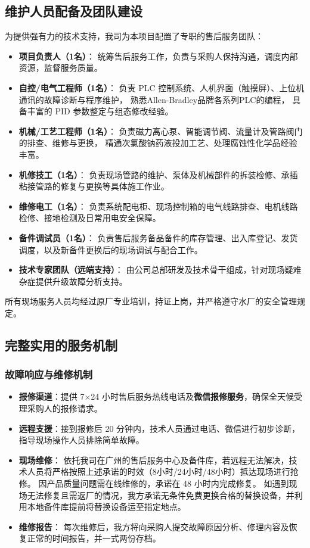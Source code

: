 \documentclass[UTF8,a4paper,12pt,titlepage]{ctexart}
\begin{document}
\subsection{维护人员配备及团队建设}
为提供强有力的技术支持，我司为本项目配置了专职的售后服务团队：
\begin{itemize}
    \item \textbf{项目负责人（1名）}：
        统筹售后服务工作，负责与采购人保持沟通，调度内部资源，监督服务质量。
    \item \textbf{自控/电气工程师（1名）}：
        负责 PLC 控制系统、人机界面（触摸屏）、上位机通讯的故障诊断与程序维护，
        熟悉Allen-Bradley品牌各系列PLC的编程，
        具备丰富的 PID 参数整定与组态修改经验。
    \item \textbf{机械/工艺工程师（1名）}：
        负责磁力离心泵、智能调节阀、流量计及管路阀门的排查、维修与更换，
        精通次氯酸钠药液投加工艺、处理腐蚀性化学品经验丰富。
    \item \textbf{机修技工（1名）}：
        负责现场管路的维护、泵体及机械部件的拆装检修、承插粘接管路的修复与更换等具体施工作业。
    \item \textbf{维修电工（1名）}：
        负责系统配电柜、现场控制箱的电气线路排查、电机线路检修、接地检测及日常用电安全保障。
    \item \textbf{备件调试员（1名）}：
        负责售后服务备品备件的库存管理、出入库登记、发货调度，以及新备件更换后的现场调试与配合工作。
    \item \textbf{技术专家团队（远端支持）}：
        由公司总部研发及技术骨干组成，针对现场疑难杂症提供升级故障分析支持。
\end{itemize}
所有现场服务人员均经过原厂专业培训，持证上岗，并严格遵守水厂的安全管理规定。

\subsection{完整实用的服务机制}
\subsubsection{故障响应与维修机制}
\begin{itemize}
    \item \textbf{报修渠道}：提供 7×24 小时售后服务热线电话及\textbf{微信报修服务}，确保全天候受理采购人的报修请求。
    \item \textbf{远程支援}：接到报修后 20 分钟内，技术人员通过电话、微信进行初步诊断，指导现场操作人员排除简单故障。
    \item \textbf{现场维修}：
        依托我司在广州的售后服务中心及备件库，若远程无法解决，技术人员将严格按照上述承诺的时效（8小时/24小时/48小时）抵达现场进行抢修。
        因产品质量问题需在线维修的，承诺在 48 小时内完成修复。
        如遇到现场无法修复且需返厂的情况，我方承诺无条件免费更换合格的替换设备，并利用本地备件库提前将替换设备运至指定地点。
    \item \textbf{维修报告}：
        每次维修后，我方将向采购人提交故障原因分析、修理内容及恢复正常的时间报告，并一式两份存档。
\end{itemize}
\end{document}

